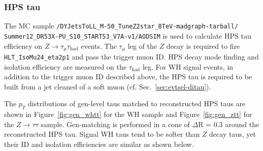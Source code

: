 \subsubsection{HPS tau\label{sec:HPS-id}}

The MC sample \texttt{/DYJetsToLL\_M-50\_TuneZ2star\_8TeV-madgraph-tarball/\\Summer12\_DR53X-PU\_S10\_START53\_V7A-v1/AODSIM} is used to calculate HPS tau efficiency on $Z\rightarrow\tau_{\mu}\tau_{\text{had}}$ events.  The $\tau_{\mu}$ leg of the $Z$ decay is required to fire \texttt{HLT\_IsoMu24\_eta2p1} and pass the trigger muon ID.  HPS decay mode finding and isolation efficiency are measured on the $\tau_{\text{had}}$ leg.  For WH signal events, in addition to the trigger muon ID described above, the HPS tau is required to be built from a jet cleaned of a soft muon (cf. Sec.~\ref{sec:evtsel-ditau}).

The $p_T$ distributions of gen-level taus matched to reconstructed HPS taus are shown in Figure~\ref{fig:gen_whtt} for the WH sample and Figure~\ref{fig:gen_ztt} for the $Z\rightarrow\tau\tau$ sample.  Gen-matching is performed in a cone of $\Delta$R = 0.3 around the reconstructed HPS tau.  Signal WH taus tend to be softer than $Z$ decay taus, yet their ID and isolation efficiencies are similar as shown below.

